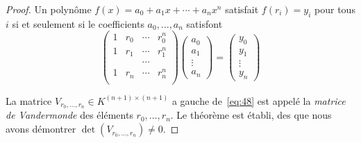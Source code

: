 \begin{proof}
  Un polynôme  $f(x) = a_0 + a_1x + \cdots + a_n x^n$ satisfait $f(r_i) = y_i$ pour tous $i$ si et seulement si le coefficients $a_0,\dots,a_n$ satisfont
  \begin{equation}
    \label{eq:48}
    \begin{pmatrix}
      1 & r_0& \cdots & r_0^n \\
      1 & r_1& \cdots & r_1^n \\
       & &  \cdots  &  \\
       1 & r_n& \cdots & r_n^n \\
     \end{pmatrix}
     \begin{pmatrix}
       a_0\\ a_1 \\ \vdots \\ a_n
     \end{pmatrix} =
     \begin{pmatrix}
       y_0\\ y_1 \\ \vdots \\ y_n
     \end{pmatrix}
   \end{equation}

   La matrice $V_{r_0,\dots,r_n} ∈K^{(n+1)×(n+1)}$  a gauche de~\eqref{eq:48} est appelé la \emph{matrice de  Vandermonde}
   des éléments $r_0,\dots,r_n$. Le théorème est établi, des que nous avons démontrer $\det(V_{r_0,\dots,r_n}) ≠0$.


\end{proof}

